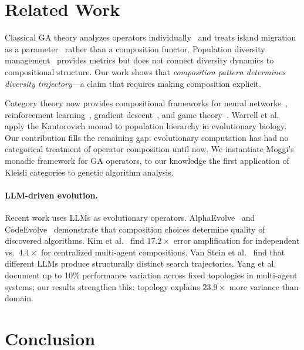 \documentclass[dvipsnames,format=sigconf,anonymous=true,review=false]{acmart}
\begin{document}
\section{Related Work}

Classical GA theory analyzes operators individually~\cite{holland1975adaptation, goldberg1989genetic, mitchell1992royal} and treats island migration as a parameter~\cite{whitley1999island, skolicki2005influence} rather than a composition functor. Population diversity management~\cite{burke2004diversity, crepinsek2013exploration} provides metrics but does not connect diversity dynamics to compositional structure. Our work shows that \emph{composition pattern determines diversity trajectory}---a claim that requires making composition explicit.

Category theory now provides compositional frameworks for neural networks~\cite{gavranovic2024categorical}, reinforcement learning~\cite{bakirtzis2024compositional, hedges2024reinforcement}, gradient descent~\cite{hanks2024gradient}, and game theory~\cite{ghani2025approximate}. Warrell et al.~\cite{warrell2024kantorovich} apply the Kantorovich monad to population hierarchy in evolutionary biology. Our contribution fills the remaining gap: evolutionary computation has had no categorical treatment of operator composition until now. We instantiate Moggi's~\cite{moggi1991notions} monadic framework for GA operators, to our knowledge the first application of Kleisli categories to genetic algorithm analysis.

\paragraph{LLM-driven evolution.}
Recent work uses LLMs as evolutionary operators. AlphaEvolve~\cite{alphaevolve2026marl} and CodeEvolve~\cite{assumpcao2025codeevolve} demonstrate that composition choices determine quality of discovered algorithms. Kim et al.~\cite{kim2025scaling} find $17.2\times$ error amplification for independent vs.\ $4.4\times$ for centralized multi-agent compositions. Van Stein et al.~\cite{vanstein2025code} find that different LLMs produce structurally distinct search trajectories. Yang et al.~\cite{yang2025topology} document up to 10\% performance variation across fixed topologies in multi-agent systems; our results strengthen this: topology explains $23.9\times$ more variance than domain.

\section{Conclusion}
\end{document}
